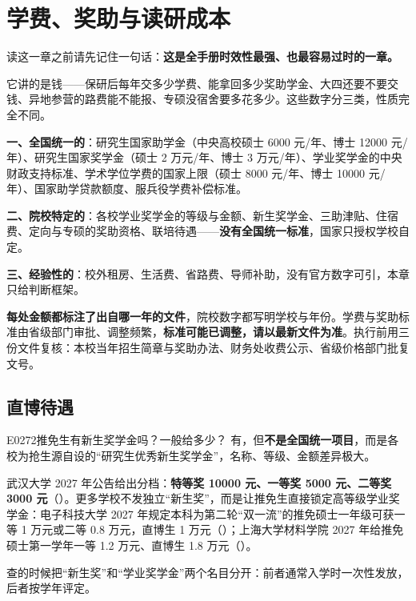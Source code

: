 \chapter{学费、奖助与读研成本}
\label{ch14}
\begin{keybox}
读这一章之前请先记住一句话：\textbf{这是全手册时效性最强、也最容易过时的一章。}

它讲的是钱——保研后每年交多少学费、能拿回多少奖助学金、大四还要不要交钱、异地参营的路费能不能报、专硕没宿舍要多花多少。这些数字分三类，性质完全不同。

\textbf{一、全国统一的}：研究生国家助学金（中央高校硕士 6000 元/年、博士 12000 元/年）、研究生国家奖学金（硕士 2 万元/年、博士 3 万元/年）、学业奖学金的中央财政支持标准、学术学位学费的国家上限（硕士 8000 元/年、博士 10000 元/年）、国家助学贷款额度、服兵役学费补偿标准。

\textbf{二、院校特定的}：各校学业奖学金的等级与金额、新生奖学金、三助津贴、住宿费、定向与专硕的奖助资格、联培待遇——\textbf{没有全国统一标准}，国家只授权学校自定。

\textbf{三、经验性的}：校外租房、生活费、省路费、导师补助，没有官方数字可引，本章只给判断框架。

\textbf{每处金额都标注了出自哪一年的文件}，院校数字都写明学校与年份。学费与奖助标准由省级部门审批、调整频繁，\textbf{标准可能已调整，请以最新文件为准}。执行前用三份文件复核：本校当年招生简章与奖助办法、财务处收费公示、省级价格部门批复文号。
\end{keybox}

\section{直博待遇}
\begin{qa}{E0272}{推免生有新生奖学金吗？一般给多少？}
有，但\textbf{不是全国统一项目}，而是各校为抢生源自设的“研究生优秀新生奖学金”，名称、等级、金额差异极大。

武汉大学 2027 年公告给出分档：\textbf{特等奖 10000 元、一等奖 5000 元、二等奖 3000 元}（）。更多学校不发独立“新生奖”，而是让推免生直接锁定高等级学业奖学金：电子科技大学 2027 年规定本科为第二轮“双一流”的推免硕士一年级可获一等 1 万元或二等 0.8 万元，直博生 1 万元（）；上海大学材料学院 2027 年给推免硕士第一学年一等 1.2 万元、直博生 1.8 万元（）。

查的时候把“新生奖”和“学业奖学金”两个名目分开：前者通常入学时一次性发放，后者按学年评定。
\end{qa}


